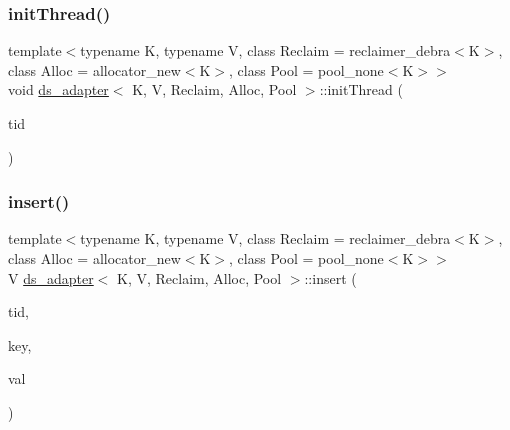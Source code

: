 \mbox{\label{classds__adapter_a3733f6a6b57312b1b5e4fb5181d82a0b}} 
\subsubsection{\texorpdfstring{init\+Thread()}{initThread()}\hspace{0.1cm}{\footnotesize\ttfamily [26/26]}}
{\footnotesize\ttfamily template$<$typename K, typename V, class Reclaim = reclaimer\+\_\+debra$<$\+K$>$, class Alloc = allocator\+\_\+new$<$\+K$>$, class Pool = pool\+\_\+none$<$\+K$>$$>$ \\
void \hyperlink{classds__adapter}{ds\+\_\+adapter}$<$ K, V, Reclaim, Alloc, Pool $>$\+::init\+Thread (\begin{DoxyParamCaption}\item[{const int}]{tid }\end{DoxyParamCaption})\hspace{0.3cm}{\ttfamily [inline]}}

\mbox{\label{classds__adapter_a6c0fc676d77e30e14946baf325174739}} 
\subsubsection{\texorpdfstring{insert()}{insert()}\hspace{0.1cm}{\footnotesize\ttfamily [1/26]}}
{\footnotesize\ttfamily template$<$typename K, typename V, class Reclaim = reclaimer\+\_\+debra$<$\+K$>$, class Alloc = allocator\+\_\+new$<$\+K$>$, class Pool = pool\+\_\+none$<$\+K$>$$>$ \\
V \hyperlink{classds__adapter}{ds\+\_\+adapter}$<$ K, V, Reclaim, Alloc, Pool $>$\+::insert (\begin{DoxyParamCaption}\item[{const int}]{tid,  }\item[{const K \&}]{key,  }\item[{const V \&}]{val }\end{DoxyParamCaption})\hspace{0.3cm}{\ttfamily [inline]}}

\mbox{\label{classds__adapter_a6c0fc676d77e30e14946baf325174739}} 
